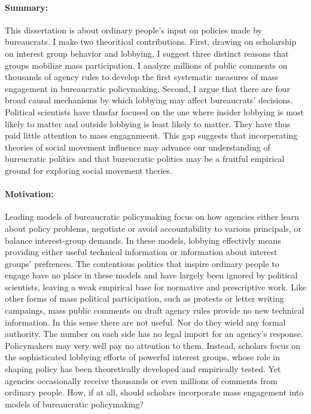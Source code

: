 
\paragraph{Summary:} This dissertation is about ordinary people's input on policies made by bureaucrats. 
I make two theoritical contributions. First, drawing on scholarship on interest group behavior and lobbying, I suggest three distinct reasons that groups mobilize mass participation. I analyze millions of public comments on thousands of agency rules to develop the first systematic measures of mass engagement in bureaucratic policymaking. Second, I argue that there are four broad causal mechanisms by which lobbying may affect bureaucrats' decisions. Political scientists have thusfar focused on the one where insider lobbying is most likely to matter and outside lobbying is least likely to matter. They have thus paid little attention to mass engagnmeent. This gap suggests that incorperating theories of social movement influence may advance our understanding of bureucratic politics and that bureucratic politics may be a fruitful empirical ground for exploring social movement theries. 


\paragraph{Motivation:} Leading models of bureaucratic policymaking focus on how agencies either learn about policy problems, negotiate or avoid accountability to various principals, or balance interest-group demands. In these models, lobbying effectivly means providing either useful technical information or information about interest groups' prefrences. 
The contentious politics that inspire ordinary people to engage have no place in these models and have largely been ignored by political scientists, leaving a weak empirical base for normative and prescriptive work. 
Like other forms of mass political participation, such as protests or letter writing campaings, 
mass public comments on draft agency rules provide no new technical information. In this sense there are not useful. Nor do they wield any formal authority. 
The number on each side has no legal import for an agency's response.
Policymakers may very well pay no attention to them. 
Instead, scholars focus on the sophisticated lobbying efforts of powerful interest groups, whose role in shaping policy has been theoretically developed and empirically tested.
Yet agencies occasionally receive thousands or even millions of comments from ordinary people. %
How, if at all, should scholars incorporate mass engagement into models of bureaucratic policymaking? 

